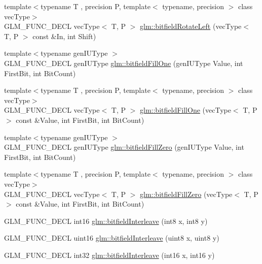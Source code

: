 \begin{DoxyCompactItemize}
{\footnotesize template$<$typename T , precision P, template$<$ typename, precision $>$ class vec\-Type$>$ }\\G\-L\-M\-\_\-\-F\-U\-N\-C\-\_\-\-D\-E\-C\-L vec\-Type$<$ T, P $>$ \hyperlink{group__gtc__bitfield_ga410d130917d85b865718e3ebc32cf0ef}{glm\-::bitfield\-Rotate\-Left} (vec\-Type$<$ T, P $>$ const \&In, int Shift)
\item 
{\footnotesize template$<$typename gen\-I\-U\-Type $>$ }\\G\-L\-M\-\_\-\-F\-U\-N\-C\-\_\-\-D\-E\-C\-L gen\-I\-U\-Type \hyperlink{group__gtc__bitfield_ga46f9295abe3b5c7658f5b13c7f819f0a}{glm\-::bitfield\-Fill\-One} (gen\-I\-U\-Type Value, int First\-Bit, int Bit\-Count)
\item 
{\footnotesize template$<$typename T , precision P, template$<$ typename, precision $>$ class vec\-Type$>$ }\\G\-L\-M\-\_\-\-F\-U\-N\-C\-\_\-\-D\-E\-C\-L vec\-Type$<$ T, P $>$ \hyperlink{group__gtc__bitfield_gad789042e84e8292ae95dc1af856f2ad5}{glm\-::bitfield\-Fill\-One} (vec\-Type$<$ T, P $>$ const \&Value, int First\-Bit, int Bit\-Count)
\item 
{\footnotesize template$<$typename gen\-I\-U\-Type $>$ }\\G\-L\-M\-\_\-\-F\-U\-N\-C\-\_\-\-D\-E\-C\-L gen\-I\-U\-Type \hyperlink{group__gtc__bitfield_ga697b86998b7d74ee0a69d8e9f8819fee}{glm\-::bitfield\-Fill\-Zero} (gen\-I\-U\-Type Value, int First\-Bit, int Bit\-Count)
\item 
{\footnotesize template$<$typename T , precision P, template$<$ typename, precision $>$ class vec\-Type$>$ }\\G\-L\-M\-\_\-\-F\-U\-N\-C\-\_\-\-D\-E\-C\-L vec\-Type$<$ T, P $>$ \hyperlink{group__gtc__bitfield_gaddba3196316b0bd240295b09b43c2958}{glm\-::bitfield\-Fill\-Zero} (vec\-Type$<$ T, P $>$ const \&Value, int First\-Bit, int Bit\-Count)
\item 
G\-L\-M\-\_\-\-F\-U\-N\-C\-\_\-\-D\-E\-C\-L int16 \hyperlink{group__gtc__bitfield_ga479134317bc95d99f2b2e235d3db287b}{glm\-::bitfield\-Interleave} (int8 x, int8 y)
\item 
G\-L\-M\-\_\-\-F\-U\-N\-C\-\_\-\-D\-E\-C\-L uint16 \hyperlink{group__gtc__bitfield_ga0700a3ceb088a0ecc23d76c154096061}{glm\-::bitfield\-Interleave} (uint8 x, uint8 y)
\item 
G\-L\-M\-\_\-\-F\-U\-N\-C\-\_\-\-D\-E\-C\-L int32 \hyperlink{group__gtc__bitfield_ga1a0264598647ae00a596865af4e1e878}{glm\-::bitfield\-Interleave} (int16 x, int16 y)
\item 

\end{DoxyCompactItemize}
